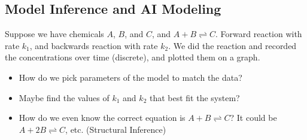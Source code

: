 \documentclass[10pt]{article}
\begin{document}
\subsection*{Model Inference and AI Modeling}
Suppose we have chemicals $A$, $B$, and $C$, and $A + B \rightleftharpoons C$.  Forward reaction with rate $k_1$, and backwards reaction with rate $k_2$.  We did the reaction and recorded the concentrations over time (discrete), and plotted them on a graph.
\begin{itemize}
	\item How do we pick parameters of the model to match the data?
	\item Maybe find the values of $k_1$ and $k_2$ that best fit the system?
	\item How do we even know the correct equation is $A + B \rightleftharpoons C$?  It could be $A + 2B \rightleftharpoons C$, etc.  (Structural Inference)
\end{itemize}
\end{document}

